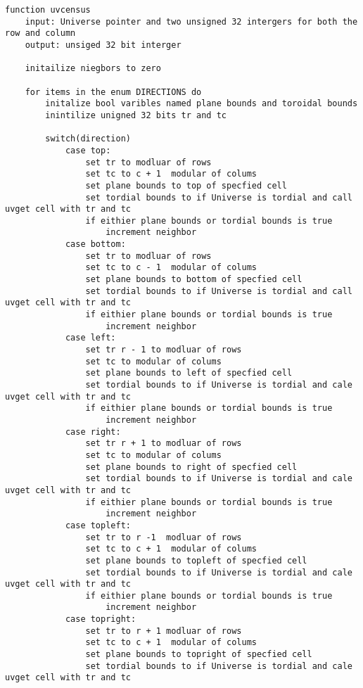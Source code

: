 \documentclass[11pt]{article} %
\begin{document}
\begin{flushleft}
\begin{lstlisting}
function uvcensus
    input: Universe pointer and two unsigned 32 intergers for both the row and column
    output: unsiged 32 bit interger

    initailize niegbors to zero
    
    for items in the enum DIRECTIONS do 
        initalize bool varibles named plane bounds and toroidal bounds
        inintilize unigned 32 bits tr and tc

        switch(direction)
            case top:
                set tr to modluar of rows 
                set tc to c + 1  modular of colums
                set plane bounds to top of specfied cell
                set tordial bounds to if Universe is tordial and call uvget cell with tr and tc 
                if eithier plane bounds or tordial bounds is true 
                    increment neighbor
            case bottom:
                set tr to modluar of rows 
                set tc to c - 1  modular of colums
                set plane bounds to bottom of specfied cell
                set tordial bounds to if Universe is tordial and call uvget cell with tr and tc 
                if eithier plane bounds or tordial bounds is true 
                    increment neighbor
            case left:
                set tr r - 1 to modluar of rows 
                set tc to modular of colums
                set plane bounds to left of specfied cell
                set tordial bounds to if Universe is tordial and cale uvget cell with tr and tc 
                if eithier plane bounds or tordial bounds is true 
                    increment neighbor
            case right:
                set tr r + 1 to modluar of rows 
                set tc to modular of colums
                set plane bounds to right of specfied cell
                set tordial bounds to if Universe is tordial and cale uvget cell with tr and tc 
                if eithier plane bounds or tordial bounds is true 
                    increment neighbor
            case topleft:
                set tr to r -1  modluar of rows 
                set tc to c + 1  modular of colums
                set plane bounds to topleft of specfied cell
                set tordial bounds to if Universe is tordial and cale uvget cell with tr and tc 
                if eithier plane bounds or tordial bounds is true 
                    increment neighbor
            case topright:
                set tr to r + 1 modluar of rows 
                set tc to c + 1  modular of colums
                set plane bounds to topright of specfied cell
                set tordial bounds to if Universe is tordial and cale uvget cell with tr and tc 

\end{lstlisting}
\end{flushleft}
\end{document}
